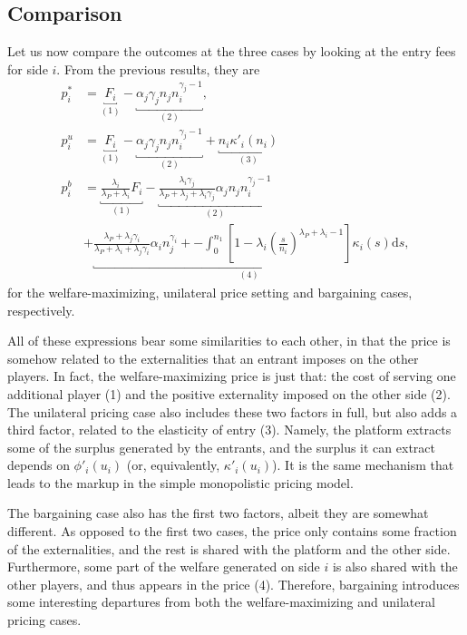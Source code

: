 \documentclass[a4paper]{article}
\newcommand{\ds}{\mathrm{d}s}
\begin{document}
\subsection{Comparison}

Let us now compare the outcomes at the three cases by looking at the entry fees for side $i$.
From the previous results, they are
\begin{align*}
    p_i^* &= \underbracket{F_i}_{(1)} - \underbracket{\alpha_j \gamma_j n_j n_i^{\gamma_j - 1}}_{(2)}, \\
    p_i^u &= \underbracket{F_i}_{(1)} - \underbracket{\alpha_j \gamma_j n_j n_i^{\gamma_j - 1}}_{(2)} + \underbracket{n_i \kappa'_i(n_i)}_{(3)} \\
    p_i^b &= \underbracket{\frac{\lambda_i}{\lambda_P + \lambda_i} F_i}_{(1)} - \underbracket{\frac{\lambda_i \gamma_j}{\lambda_P + \lambda_j + \lambda_i\gamma_j} \alpha_j n_j n_i^{\gamma_j - 1}}_{(2)} \\
    &+ \underbracket{\frac{\lambda_P + \lambda_j\gamma_i}{\lambda_P + \lambda_i + \lambda_j\gamma_i} \alpha_i n_j^{\gamma_i} +
    - \int_0^{n_1} \left[ 1 - \lambda_i \left( \frac{s}{n_i} \right)^{\lambda_P + \lambda_i - 1} \right] \kappa_i(s) \ds}_{(4)},
\end{align*}
for the welfare-maximizing, unilateral price setting and bargaining cases, respectively.

All of these expressions bear some similarities to each other, in that the price is somehow related to the externalities that an entrant imposes on the other players.
In fact, the welfare-maximizing price is just that: the cost of serving one additional player (1) and the positive externality imposed on the other side (2).
The unilateral pricing case also includes these two factors in full, but also adds a third factor, related to the elasticity of entry (3).
Namely, the platform extracts some of the surplus generated by the entrants, and the surplus it can extract depends on $\phi'_i(u_i)$ (or, equivalently, $\kappa'_i(u_i)$).
It is the same mechanism that leads to the markup in the simple monopolistic pricing model.

The bargaining case also has the first two factors, albeit they are somewhat different.
As opposed to the first two cases, the price only contains some fraction of the externalities, and the rest is shared with the platform and the other side.
Furthermore, some part of the welfare generated on side $i$ is also shared with the other players, and thus appears in the price (4).
Therefore, bargaining introduces some interesting departures from both the welfare-maximizing and unilateral pricing cases.
\end{document}
